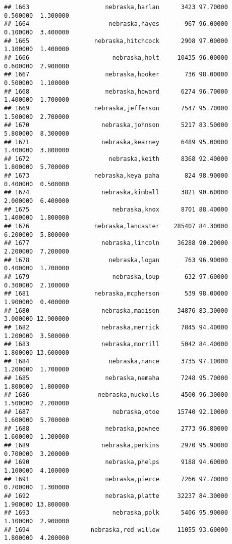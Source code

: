 \documentclass[
]{article}
\begin{document}
\begin{verbatim}
## 1663                     nebraska,harlan      3423 97.70000  0.500000  1.300000
## 1664                      nebraska,hayes       967 96.00000  0.100000  3.400000
## 1665                  nebraska,hitchcock      2908 97.00000  1.100000  1.400000
## 1666                       nebraska,holt     10435 96.00000  0.600000  2.900000
## 1667                     nebraska,hooker       736 98.00000  0.500000  1.100000
## 1668                     nebraska,howard      6274 96.70000  1.400000  1.700000
## 1669                  nebraska,jefferson      7547 95.70000  1.500000  2.700000
## 1670                    nebraska,johnson      5217 83.50000  5.800000  8.300000
## 1671                    nebraska,kearney      6489 95.00000  1.400000  3.800000
## 1672                      nebraska,keith      8368 92.40000  1.800000  5.700000
## 1673                  nebraska,keya paha       824 98.90000  0.400000  0.500000
## 1674                    nebraska,kimball      3821 90.60000  2.000000  6.400000
## 1675                       nebraska,knox      8701 88.40000  1.400000  1.800000
## 1676                  nebraska,lancaster    285407 84.30000  6.200000  5.800000
## 1677                    nebraska,lincoln     36288 90.20000  2.200000  7.200000
## 1678                      nebraska,logan       763 96.90000  0.400000  1.700000
## 1679                       nebraska,loup       632 97.60000  0.300000  2.100000
## 1681                  nebraska,mcpherson       539 98.00000  1.900000  0.400000
## 1680                    nebraska,madison     34876 83.30000  3.000000 12.900000
## 1682                    nebraska,merrick      7845 94.40000  1.200000  3.500000
## 1683                    nebraska,morrill      5042 84.40000  1.800000 13.600000
## 1684                      nebraska,nance      3735 97.10000  1.200000  1.700000
## 1685                     nebraska,nemaha      7248 95.70000  1.800000  1.800000
## 1686                   nebraska,nuckolls      4500 96.30000  1.500000  2.200000
## 1687                       nebraska,otoe     15740 92.10000  1.600000  5.700000
## 1688                     nebraska,pawnee      2773 96.80000  1.600000  1.300000
## 1689                    nebraska,perkins      2970 95.90000  0.700000  3.200000
## 1690                     nebraska,phelps      9188 94.60000  1.100000  4.100000
## 1691                     nebraska,pierce      7266 97.70000  0.700000  1.300000
## 1692                     nebraska,platte     32237 84.30000  1.900000 13.800000
## 1693                       nebraska,polk      5406 95.90000  1.100000  2.900000
## 1694                 nebraska,red willow     11055 93.60000  1.800000  4.200000

\end{verbatim}
\end{document}
